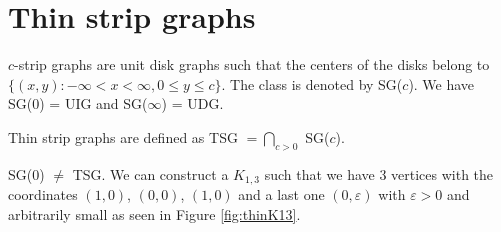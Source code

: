 \chapter{Thin strip graphs}
\label{chap:thinDef}


$c$-strip graphs are unit disk graphs such that the centers of the disks belong to
$\{(x,y) : -\infty < x < \infty, 0 \leq y \leq c\}$. The class is denoted by SG($c$). We
have SG(0) = UIG and SG($\infty$) = UDG. \cite{hayashiThinStripGraphs2017}

\begin{defn}
  Thin strip graphs are defined as TSG $= \bigcap_{c > 0}$ SG($c$).
\end{defn}

\begin{remark}
  SG($0$) $\neq$ TSG. We can construct a $K_{1,3}$ such that we have 3 vertices with the coordinates
  $(1,0)$, $(0,0)$, $(1,0)$ and a last one $(0,\varepsilon)$ with $\varepsilon > 0$ and arbitrarily small
  as seen in Figure \ref{fig:thinK13}.
\end{remark}

